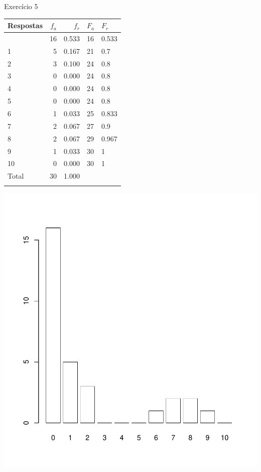 \documentclass[
  ignorenonframetext,
  serif,
  professionalfont,
  usenames,
  dvipsnames,
  aspectratio = 169]{beamer}
\def\beginAHalfColumn{\begin{minipage}{0.49\textwidth}}%
\def\endColumns{\end{minipage}}%
\begin{document}
\begin{frame}{Exercício 5}
\label{exercuxedcio-5-2}
\beginAHalfColumn

\begin{longtable}[]{@{}lrrll@{}}
\toprule\noalign{}
Respostas & \(f_a\) & \(f_r\) & \(F_{a}\) & \(F_{r}\) \\
\midrule\noalign{}
\endhead
0 & 16 & 0.533 & 16 & 0.533 \\
1 & 5 & 0.167 & 21 & 0.7 \\
2 & 3 & 0.100 & 24 & 0.8 \\
3 & 0 & 0.000 & 24 & 0.8 \\
4 & 0 & 0.000 & 24 & 0.8 \\
5 & 0 & 0.000 & 24 & 0.8 \\
6 & 1 & 0.033 & 25 & 0.833 \\
7 & 2 & 0.067 & 27 & 0.9 \\
8 & 2 & 0.067 & 29 & 0.967 \\
9 & 1 & 0.033 & 30 & 1 \\
10 & 0 & 0.000 & 30 & 1 \\
Total & 30 & 1.000 & & \\
\bottomrule\noalign{}
\end{longtable}

\endColumns
\beginAHalfColumn

\begin{center}\includegraphics[width=0.9\linewidth]{exercicios-encontro1-solucao_files/figure-beamer/unnamed-chunk-16-1} \end{center}

\endColumns
\end{frame}
\end{document}
